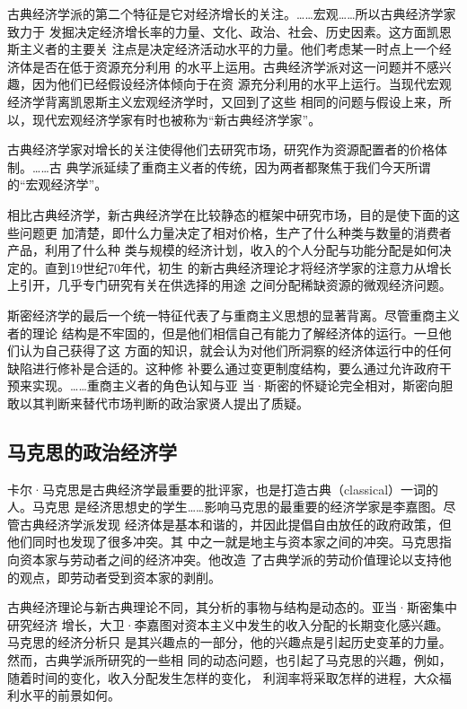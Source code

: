 古典经济学派的第二个特征是它对经济增长的关注。……宏观……所以古典经济学家致力于
发掘决定经济增长率的力量、文化、政治、社会、历史因素。这方面凯恩斯主义者的主要关
注点是决定经济活动水平的力量。他们考虑某一时点上一个经济体是否在低于资源充分利用
的水平上运用。古典经济学派对这一问题并不感兴趣，因为他们已经假设经济体倾向于在资
源充分利用的水平上运行。当现代宏观经济学背离凯恩斯主义宏观经济学时，又回到了这些
相同的问题与假设上来，所以，现代宏观经济学家有时也被称为“新古典经济学家”。

古典经济学家对增长的关注使得他们去研究市场，研究作为资源配置者的价格体制。……古
典学派延续了重商主义者的传统，因为两者都聚焦于我们今天所谓的“宏观经济学”。

相比古典经济学，新古典经济学在比较静态的框架中研究市场，目的是使下面的这些问题更
加清楚，即什么力量决定了相对价格，生产了什么种类与数量的消费者产品，利用了什么种
类与规模的经济计划，收入的个人分配与功能分配是如何决定的。直到19世纪70年代，初生
的新古典经济理论才将经济学家的注意力从增长上引开，几乎专门研究有关在供选择的用途
之间分配稀缺资源的微观经济问题。

斯密经济学的最后一个统一特征代表了与重商主义思想的显著背离。尽管重商主义者的理论
结构是不牢固的，但是他们相信自己有能力了解经济体的运行。一旦他们认为自己获得了这
方面的知识，就会认为对他们所洞察的经济体运行中的任何缺陷进行修补是合适的。这种修
补要么通过变更制度结构，要么通过允许政府干预来实现。……重商主义者的角色认知与亚
当·斯密的怀疑论完全相对，斯密向胆敢以其判断来替代市场判断的政治家贤人提出了质疑。

\subsection{马克思的政治经济学}

卡尔·马克思是古典经济学最重要的批评家，也是打造古典（classical）一词的人。马克思
是经济思想史的学生……影响马克思的最重要的经济学家是李嘉图。尽管古典经济学派发现
经济体是基本和谐的，并因此提倡自由放任的政府政策，但他们同时也发现了很多冲突。其
中之一就是地主与资本家之间的冲突。马克思指向资本家与劳动者之间的经济冲突。他改造
了古典学派的劳动价值理论以支持他的观点，即劳动者受到资本家的剥削。

古典经济理论与新古典理论不同，其分析的事物与结构是动态的。亚当·斯密集中研究经济
增长，大卫·李嘉图对资本主义中发生的收入分配的长期变化感兴趣。马克思的经济分析只
是其兴趣点的一部分，他的兴趣点是引起历史变革的力量。然而，古典学派所研究的一些相
同的动态问题，也引起了马克思的兴趣，例如，随着时间的变化，收入分配发生怎样的变化，
利润率将采取怎样的进程，大众福利水平的前景如何。

